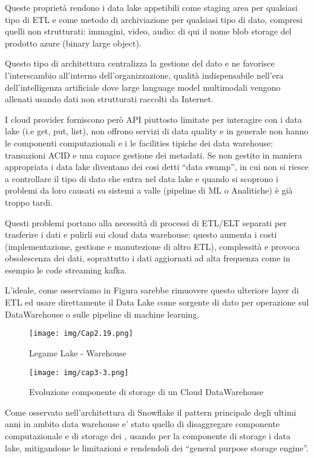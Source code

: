 \documentclass[a4paper,12pt]{report}
\begin{document}
\noindent
Queste proprietà rendono i data lake appetibili come staging area per qualsiasi tipo di ETL e come metodo di archiviazione per qualsiasi tipo di dato, compresi quelli non strutturati: immagini, video, audio: di qui il nome blob storage del prodotto azure (binary large object).

\noindent
Questo tipo di architettura centralizza la gestione del dato e ne favorisce l’interscambio all’interno dell’organizzazione, qualità indispensabile nell’era dell’intelligenza artificiale dove large language model multimodali vengono allenati usando dati non strutturati raccolti da Internet.

\noindent
I cloud provider forniscono però API piuttosto limitate per interagire con i data lake (i.e get, put, list), non offrono servizi di data quality e in generale non hanno le componenti computazionali  e i le facilities tipiche dei data warehouse: transazioni ACID e una capace gestione dei metadati. Se non gestito in maniera appropriata i data lake diventano dei cosi detti “data swamp”, in cui non si riesce a controllare il tipo di dato che entra nel data lake e quando si scoprono i problemi da loro causati su sistemi a valle (pipeline di ML o Analitiche) è già troppo tardi.

\noindent
Questi problemi portano alla necessità di processi di ETL/ELT separati per trasferire i dati e pulirli sui cloud data warehouse: questo aumenta i costi (implementazione, gestione e manutezione di altro ETL), complessità e provoca obsolescenza dei dati, soprattutto i dati aggiornati ad alta frequenza come in esempio le code streaming kafka.

\noindent
L’ideale, come osserviamo in Figura sarebbe rimuovere questo ulteriore layer di ETL ed usare direttamente il Data Lake come sorgente di dato per operazione sul DataWarehouse o sulle pipeline di machine learning.
\begin{figure}[h]
    \centering
    \texttt{[image: img/Cap2.19.png]}
    \caption{Legame Lake - Warehouse}
\end{figure}

\begin{figure}[h]
    \centering
    \texttt{[image: img/cap3-3.png]}
    \caption{Evoluzione componente di storage di un Cloud DataWarehouse}
\end{figure}

\noindent
Come osservato nell’architettura di Snowflake il pattern principale degli ultimi anni in ambito data warehouse e’ stato quello di disaggregare componente computazionale e di storage dei , usando per la componente di storage i data lake, mitigandone le limitazioni e rendendoli dei “general purpose storage engine”.
\end{document}
